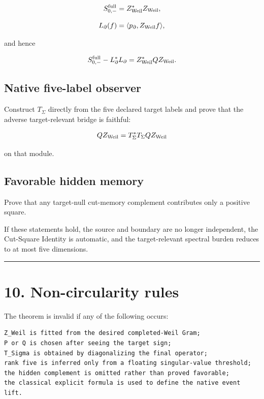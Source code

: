 \[
S_{0,-}^{\rm full}=Z_{\rm Weil}^*Z_{\rm Weil},
\]

\[
L_\partial(f)=\langle p_\partial,Z_{\rm Weil}f\rangle,
\]

and hence

\[
S_{0,-}^{\rm full}-L_\partial^*L_\partial
=Z_{\rm Weil}^*QZ_{\rm Weil}.
\]

\hypertarget{native-five-label-observer}{%
\subsection{Native five-label observer}\label{native-five-label-observer}}

Construct \(T_\Sigma\) directly from the five declared target labels and prove
that the adverse target-relevant bridge is faithful:

\[
QZ_{\rm Weil}
=T_\Sigma^*T_\Sigma QZ_{\rm Weil}
\]

on that module.

\hypertarget{favorable-hidden-memory}{%
\subsection{Favorable hidden memory}\label{favorable-hidden-memory}}

Prove that any target-null cut-memory complement contributes only a positive
square.

If these statements hold, the source and boundary are no longer independent,
the Cut-Square Identity is automatic, and the target-relevant spectral burden
reduces to at most five dimensions.

\begin{center}\rule{0.5\linewidth}{0.5pt}\end{center}

\hypertarget{non-circularity-rules}{%
\section{10. Non-circularity rules}\label{non-circularity-rules}}

The theorem is invalid if any of the following occurs:

\begin{verbatim}
Z_Weil is fitted from the desired completed-Weil Gram;
P or Q is chosen after seeing the target sign;
T_Sigma is obtained by diagonalizing the final operator;
rank five is inferred only from a floating singular-value threshold;
the hidden complement is omitted rather than proved favorable;
the classical explicit formula is used to define the native event lift.
\end{verbatim}

